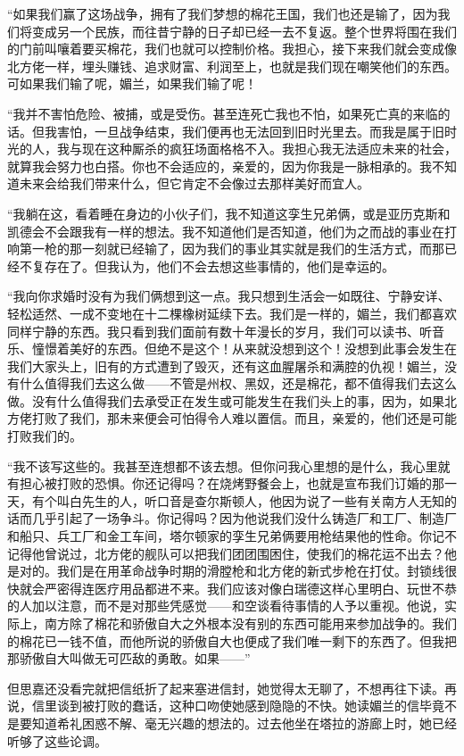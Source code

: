 \par “如果我们赢了这场战争，拥有了我们梦想的棉花王国，我们也还是输了，因为我们将变成另一个民族，而往昔宁静的日子却已经一去不复返。整个世界将围在我们的门前叫嚷着要买棉花，我们也就可以控制价格。我担心，接下来我们就会变成像北方佬一样，埋头赚钱、追求财富、利润至上，也就是我们现在嘲笑他们的东西。可如果我们输了呢，媚兰，如果我们输了呢！
\par “我并不害怕危险、被捕，或是受伤。甚至连死亡我也不怕，如果死亡真的来临的话。但我害怕，一旦战争结束，我们便再也无法回到旧时光里去。而我是属于旧时光的人，我与现在这种厮杀的疯狂场面格格不入。我担心我无法适应未来的社会，就算我会努力也白搭。你也不会适应的，亲爱的，因为你我是一脉相承的。我不知道未来会给我们带来什么，但它肯定不会像过去那样美好而宜人。
\par “我躺在这，看着睡在身边的小伙子们，我不知道这孪生兄弟俩，或是亚历克斯和凯德会不会跟我有一样的想法。我不知道他们是否知道，他们为之而战的事业在打响第一枪的那一刻就已经输了，因为我们的事业其实就是我们的生活方式，而那已经不复存在了。但我认为，他们不会去想这些事情的，他们是幸运的。
\par “我向你求婚时没有为我们俩想到这一点。我只想到生活会一如既往、宁静安详、轻松适然、一成不变地在十二棵橡树延续下去。我们是一样的，媚兰，我们都喜欢同样宁静的东西。我只看到我们面前有数十年漫长的岁月，我们可以读书、听音乐、憧憬着美好的东西。但绝不是这个！从来就没想到这个！没想到此事会发生在我们大家头上，旧有的方式遭到了毁灭，还有这血腥屠杀和满腔的仇视！媚兰，没有什么值得我们去这么做——不管是州权、黑奴，还是棉花，都不值得我们去这么做。没有什么值得我们去承受正在发生或可能发生在我们头上的事，因为，如果北方佬打败了我们，那未来便会可怕得令人难以置信。而且，亲爱的，他们还是可能打败我们的。
\par “我不该写这些的。我甚至连想都不该去想。但你问我心里想的是什么，我心里就有担心被打败的恐惧。你还记得吗？在烧烤野餐会上，也就是宣布我们订婚的那一天，有个叫白先生的人，听口音是查尔斯顿人，他因为说了一些有关南方人无知的话而几乎引起了一场争斗。你记得吗？因为他说我们没什么铸造厂和工厂、制造厂和船只、兵工厂和金工车间，塔尔顿家的孪生兄弟俩要用枪结果他的性命。你记不记得他曾说过，北方佬的舰队可以把我们团团围困住，使我们的棉花运不出去？他是对的。我们是在用革命战争时期的滑膛枪和北方佬的新式步枪在打仗。封锁线很快就会严密得连医疗用品都进不来。我们应该对像白瑞德这样心里明白、玩世不恭的人加以注意，而不是对那些凭感觉——和空谈看待事情的人予以重视。他说，实际上，南方除了棉花和骄傲自大之外根本没有别的东西可能用来参加战争的。我们的棉花已一钱不值，而他所说的骄傲自大也便成了我们唯一剩下的东西了。但我把那骄傲自大叫做无可匹敌的勇敢。如果——”
\par 但思嘉还没看完就把信纸折了起来塞进信封，她觉得太无聊了，不想再往下读。再说，信里谈到被打败的蠢话，这种口吻使她感到隐隐的不快。她读媚兰的信毕竟不是要知道希礼困惑不解、毫无兴趣的想法的。过去他坐在塔拉的游廊上时，她已经听够了这些论调。
